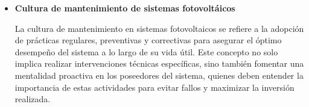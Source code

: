 \begin{itemize}
  \item \textbf{Cultura de mantenimiento de sistemas fotovoltáicos}

  La cultura de mantenimiento en sistemas fotovoltaicos se refiere a la adopción de prácticas regulares, preventivas y correctivas para asegurar el óptimo desempeño del sistema a lo largo de su vida útil. Este concepto no solo implica realizar intervenciones técnicas específicas, sino también fomentar una mentalidad proactiva en los poseedores del sistema, quienes deben entender la importancia de estas actividades para evitar fallos y maximizar la inversión realizada.

\end{itemize}

